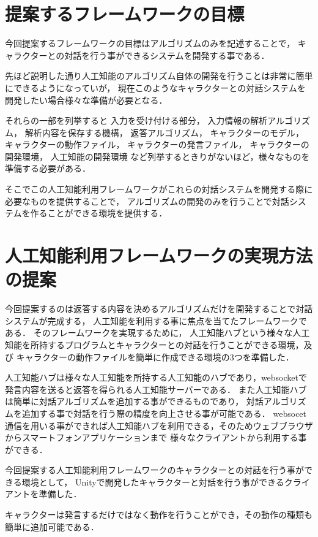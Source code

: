 \section{提案するフレームワークの目標}
今回提案するフレームワークの目標はアルゴリズムのみを記述することで，
キャラクターとの対話を行う事ができるシステムを開発する事である．

先ほど説明した通り人工知能のアルゴリズム自体の開発を行うことは非常に簡単にできるようになっていが，
現在このようなキャラクターとの対話システムを開発したい場合様々な準備が必要となる．

それらの一部を列挙すると
入力を受け付ける部分，
入力情報の解析アルゴリズム，
解析内容を保存する機構，
返答アルゴリズム，
キャラクターのモデル，
キャラクターの動作ファイル，
キャラクターの発言ファイル，
キャラクターの開発環境，
人工知能の開発環境
など列挙するときりがないほど，様々なものを準備する必要がある．

そこでこの人工知能利用フレームワークがこれらの対話システムを開発する際に必要なものを提供することで，
アルゴリズムの開発のみを行うことで対話システムを作ることができる環境を提供する．

\section{人工知能利用フレームワークの実現方法の提案}
今回提案するのは返答する内容を決めるアルゴリズムだけを開発することで対話システムが完成する，
人工知能を利用する事に焦点を当てたフレームワークである．
そのフレームワークを実現するために，
人工知能ハブという様々な人工知能を所持するプログラムとキャラクターとの対話を行うことができる環境，及び
キャラクターの動作ファイルを簡単に作成できる環境の3つを準備した．

人工知能ハブは様々な人工知能を所持する人工知能のハブであり，websocketで発言内容を送ると返答を得られる人工知能サーバーである．
また人工知能ハブは簡単に対話アルゴリズムを追加する事ができるものであり，
対話アルゴリズムを追加する事で対話を行う際の精度を向上させる事が可能である．
websocet通信を用いる事ができれば人工知能ハブを利用できる，そのためウェブブラウザからスマートフォンアプリケーションまで
様々なクライアントから利用する事ができる．

今回提案する人工知能利用フレームワークのキャラクターとの対話を行う事ができる環境として，
Unityで開発したキャラクターと対話を行う事ができるクライアントを準備した．

キャラクターは発言するだけではなく動作を行うことができ，その動作の種類も簡単に追加可能である．

